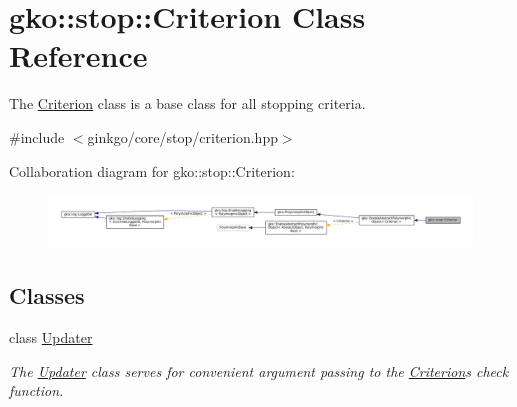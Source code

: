\hypertarget{classgko_1_1stop_1_1Criterion}{}\section{gko\+:\+:stop\+:\+:Criterion Class Reference}
\label{classgko_1_1stop_1_1Criterion}


The \hyperlink{classgko_1_1stop_1_1Criterion}{Criterion} class is a base class for all stopping criteria.  




{\ttfamily \#include $<$ginkgo/core/stop/criterion.\+hpp$>$}



Collaboration diagram for gko\+:\+:stop\+:\+:Criterion\+:
\nopagebreak
\begin{figure}[H]
\begin{center}
\leavevmode
\includegraphics[width=350pt]{classgko_1_1stop_1_1Criterion__coll__graph}
\end{center}
\end{figure}
\subsection*{Classes}
\begin{DoxyCompactItemize}
\item 
class \hyperlink{classgko_1_1stop_1_1Criterion_1_1Updater}{Updater}
\begin{DoxyCompactList}\small\item\em The \hyperlink{classgko_1_1stop_1_1Criterion_1_1Updater}{Updater} class serves for convenient argument passing to the \hyperlink{classgko_1_1stop_1_1Criterion}{Criterion}\textquotesingle{}s check function. \end{DoxyCompactList}\end{DoxyCompactItemize}
